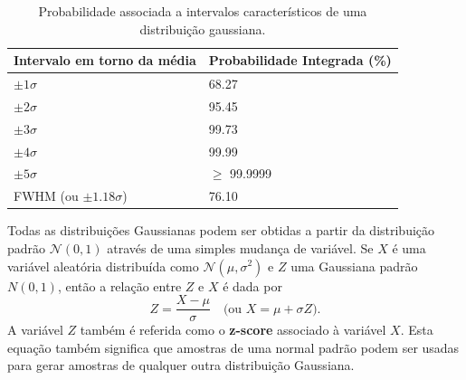 \begin{table}
	\centering
	\begin{tabular}{|l|l|}
		\hline
		Intervalo em torno da média & Probabilidade Integrada (\%) \\ \hline
		$\pm 1\sigma$               & 68.27                        \\ \hline
		$\pm 2\sigma$               & 95.45                        \\ \hline
		$\pm 3\sigma$               & 99.73                        \\ \hline
		$\pm 4\sigma$               & 99.99                        \\ \hline
		$\pm 5\sigma$               & $\geq$ 99.9999               \\ \hline
		FWHM (ou $\pm 1.18 \sigma$) & 76.10                        \\ \hline
	\end{tabular}
	\caption{Probabilidade associada a intervalos característicos de uma distribuição gaussiana.}
	\label{tab:3-2}
\end{table}

Todas as distribuições Gaussianas podem ser obtidas a partir da distribuição padrão $\mathcal{N}(0, 1)$ através de uma simples mudança de variável. Se $X$ é uma variável aleatória distribuída como $\mathcal{N}(\mu, \sigma^2)$ e $Z$ uma Gaussiana padrão $N(0, 1)$, então a relação entre $Z$ e $X$ é dada por
\begin{equation}
Z = \dfrac{X - \mu}{\sigma} \quad \text{(ou } X = \mu + \sigma Z \text{)}.
\end{equation}
A variável $Z$ também é referida como o \textbf{z-score} associado à variável $X$. Esta equação também significa que amostras de uma normal padrão podem ser usadas para gerar amostras de qualquer outra distribuição Gaussiana.